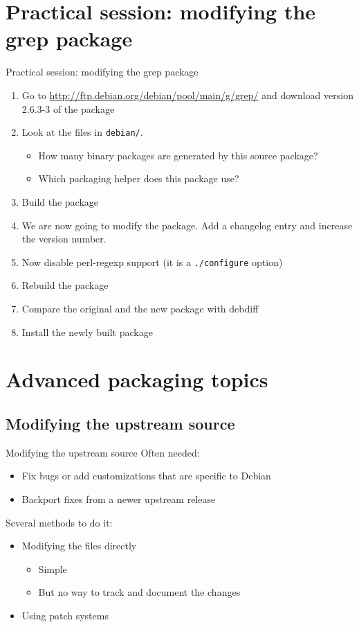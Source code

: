 \documentclass[10pt,final]{beamer}
\begin{document}
\section{Practical session: modifying the grep package}
\begin{frame}{Practical session: modifying the grep package}
\begin{enumerate}
	\item Go to \url{http://ftp.debian.org/debian/pool/main/g/grep/} and
		download version 2.6.3-3 of the package
	\item Look at the files in \texttt{debian/}.
		\begin{itemize}
			\item 		How many binary packages are generated by this source package?
			\item 		Which packaging helper does this package use?
		\end{itemize}
	\item Build the package
	\item We are now going to modify the package. Add a changelog entry and increase the version number.
	\item Now disable perl-regexp support (it is a \texttt{./configure} option)
	\item Rebuild the package
	\item Compare the original and the new package with debdiff
	\item Install the newly built package
\end{enumerate}
\end{frame}

\section{Advanced packaging topics}
\subsection{Modifying the upstream source}
\begin{frame}{Modifying the upstream source}
Often needed:
\begin{itemize}
\item Fix bugs or add customizations that are specific to Debian
\hbr
\item Backport fixes from a newer upstream release
\end{itemize}
\br
Several methods to do it:
\begin{itemize}
\item Modifying the files directly
	\begin{itemize}
		\item Simple
		\item But no way to track and document the changes
	\end{itemize}
	\hbr
\item Using patch systems
\end{itemize}
\end{frame}
\end{document}
